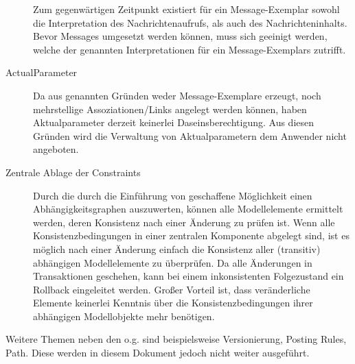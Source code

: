 \begin{description}
  Zum gegenwärtigen Zeitpunkt existiert für ein Message-Exemplar sowohl die Interpretation des Nachrichtenaufrufs, als auch des Nachrichteninhalts.
Bevor Messages umgesetzt werden können, muss sich geeinigt werden, welche der genannten Interpretationen für ein Message-Exemplars zutrifft. 
  \item[ActualParameter] Da aus genannten Gründen weder Message-Exemplare erzeugt, noch mehrstellige Assoziationen/Links angelegt werden können, 
  haben Aktualparameter derzeit keinerlei Daseinsberechtigung. Aus diesen Gründen wird die Verwaltung von Aktualparametern dem Anwender nicht angeboten.
  \item[Zentrale Ablage der Constraints] Durch die durch die Einführung von  geschaffene Möglichkeit einen Abhängigkeitsgraphen 
		auszuwerten, können alle Modellelemente ermittelt werden, deren Konsistenz nach einer Änderung zu prüfen ist. Wenn alle Konsistenzbedingungen 
		in einer zentralen Komponente abgelegt sind, ist es möglich nach einer Änderung einfach die Konsistenz aller (transitiv) abhängigen Modellelemente zu überprüfen. 
		Da alle Änderungen in Transaktionen geschehen, kann bei einem inkonsistenten Folgezustand ein Rollback eingeleitet werden.
		Großer Vorteil ist, dass veränderliche Elemente keinerlei Kenntnis über die Konsistenzbedingungen ihrer abhängigen Modellobjekte mehr benötigen.
\end{description}

Weitere Themen neben den o.g. sind beispielsweise Versionierung, Posting Rules, Path. Diese werden in diesem Dokument jedoch nicht weiter ausgeführt.